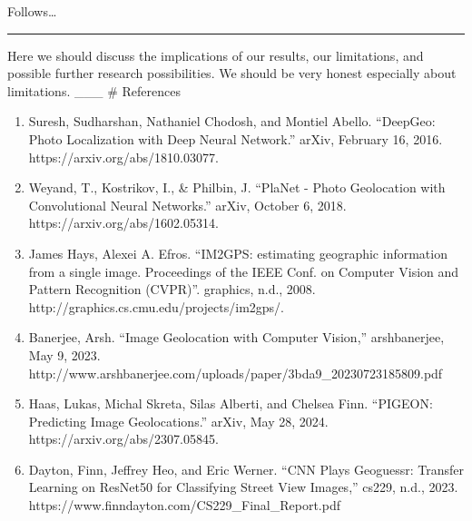 \documentclass{article}
\providecommand{\tightlist}{%
  \setlength{\itemsep}{0pt}\setlength{\parskip}{0pt}}
\begin{document}
Follows\ldots{}

\begin{center}\rule{0.5\linewidth}{0.5pt}\end{center}

Here we should discuss the implications of our results, our limitations,
and possible further research possibilities. We should be very honest
especially about limitations. \_\_\_ \# References

\begin{enumerate}
\def\labelenumi{\arabic{enumi}.}
\tightlist
\item
  Suresh, Sudharshan, Nathaniel Chodosh, and Montiel Abello. ``DeepGeo:
  Photo Localization with Deep Neural Network.'' arXiv, February 16,
  2016. https://arxiv.org/abs/1810.03077.
\item
  Weyand, T., Kostrikov, I., \& Philbin, J. ``PlaNet - Photo Geolocation
  with Convolutional Neural Networks.'' arXiv, October 6, 2018.
  https://arxiv.org/abs/1602.05314.
\item
  James Hays, Alexei A. Efros. ``IM2GPS: estimating geographic
  information from a single image. Proceedings of the IEEE Conf. on
  Computer Vision and Pattern Recognition (CVPR)''. graphics, n.d.,
  2008. http://graphics.cs.cmu.edu/projects/im2gps/.
\item
  Banerjee, Arsh. ``Image Geolocation with Computer Vision,''
  arshbanerjee, May 9, 2023.
  http://www.arshbanerjee.com/uploads/paper/3bda9\_20230723185809.pdf
\item
  Haas, Lukas, Michal Skreta, Silas Alberti, and Chelsea Finn. ``PIGEON:
  Predicting Image Geolocations.'' arXiv, May 28, 2024.
  https://arxiv.org/abs/2307.05845.
\item
  Dayton, Finn, Jeffrey Heo, and Eric Werner. ``CNN Plays Geoguessr:
  Transfer Learning on ResNet50 for Classifying Street View Images,''
  cs229, n.d., 2023. https://www.finndayton.com/CS229\_Final\_Report.pdf
\end{enumerate}

\end{document}
